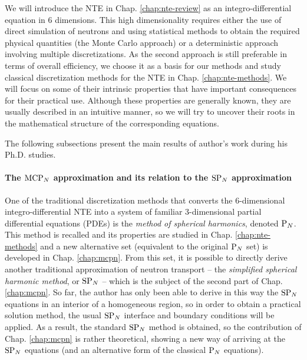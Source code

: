 We will introduce the NTE in Chap. \ref{chap:nte-review} as an integro-differential equation in 6 dimensions.
This high dimensionality requires either the use of direct simulation of neutrons and using statistical methods to obtain the
required physical quantities (the Monte Carlo approach) or a deterministic approach involving multiple discretizations.
As the second approach is still preferable in terms of overall efficiency, we choose it as a basis for our methods and
study classical discretization methods for the NTE in Chap. \ref{chap:nte-methods}. We will focus on some of
their intrinsic properties that have important consequences for their practical use. Although these properties are
generally known, they are usually described in an intuitive manner, so we will try to uncover their roots in the
mathematical structure of the corresponding equations.

The following subsections present the main results of author's work during his Ph.D. studies.

\paragraph{The $\text{MCP}_{N}$ approximation and its relation to the $\text{SP}_{N}$ approximation} 
One of the traditional discretization methods that converts the 6-dimensional integro-differential NTE into a system of
familiar 3-dimensional partial differential equations (PDEs) is the
\textit{method of spherical harmonics}, denoted $\text{P}_{N}$. This method is recalled and its properties are
studied in Chap. \ref{chap:nte-methods} and a new alternative set (equivalent to the original $\text{P}_{N}$ set) is developed in
Chap. \ref{chap:mcpn}. From this set, it is possible to directly derive another traditional approximation of neutron
transport -- the \textit{simplified spherical harmonic method}, or $\text{SP}_{N}$  -- which is the subject of the second part of Chap. \ref{chap:mcpn}. So far, the author has only
been able to derive in this way the $\text{SP}_{N}$ equations in an interior of a homogeneous region, so in order to obtain a
practical solution method, the usual $\text{SP}_{N}$ interface and boundary conditions will be applied. As a result, the standard
$\text{SP}_{N}$ method is obtained, so the contribution of Chap. \ref{chap:mcpn} is rather theoretical, showing a new way of
arriving at the $\text{SP}_{N}$ equations (and an alternative form of the classical $\text{P}_{N}$ equations).

